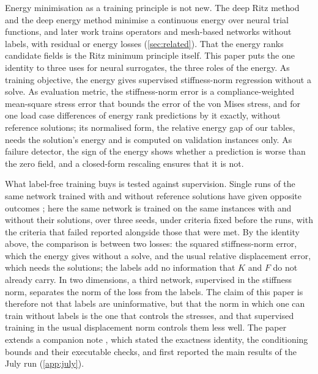 Energy minimisation as a training principle is not new. The deep Ritz method
\cite{EYu2018} and the deep energy method \cite{Samaniego2020} minimise a continuous energy
over neural trial functions, and later work trains operators and mesh-based networks
without labels, with residual or energy losses
\cite{Xu2024VOL,Eshaghi2025VINO,Lee2025FEONet,Dalton2023,Wurth2024,Wang2026PretrainFEM}
(\cref{sec:related}). That the energy ranks candidate fields is the Ritz minimum principle
itself. This paper puts the one identity to three uses for neural surrogates, the three
roles of the energy. As training objective, the energy gives supervised stiffness-norm
regression without a solve. As evaluation metric, the stiffness-norm error is a
compliance-weighted mean-square stress error that bounds the error of the von Mises stress,
and for one load case differences of energy rank predictions by it exactly, without
reference solutions; its normalised form, the relative energy gap of our tables, needs the
solution's energy and is computed on validation instances only. As failure detector, the
sign of the energy shows whether a prediction is worse than the zero field, and a
closed-form rescaling ensures that it is not.

What label-free training buys is tested against supervision. Single runs of the same
network trained with and without reference solutions have given opposite outcomes
\cite{Dalton2023,MonteiroFernandes2025,Sun2026FEVessel}; here the same network is trained on
the same
instances with and without their solutions, over three seeds, under criteria fixed before
the runs, with the criteria that failed reported alongside those that were met. By the
identity above, the comparison is between two losses: the squared stiffness-norm error,
which the energy gives without a solve, and the usual relative displacement error, which
needs the solutions; the labels add no information that $K$ and $F$ do not already carry.
In two dimensions, a third network, supervised in the stiffness norm, separates the norm of
the loss from the labels. The claim of this paper is therefore not that labels are
uninformative, but that the norm in which one can train without labels is the one that
controls the stresses, and that supervised training in the usual displacement norm controls
them less well. The paper extends a companion note \cite{CaoSong2026}, which stated the
exactness identity, the conditioning bounds and their executable checks, and first reported
the main results of the July run (\ref{app:july}).

